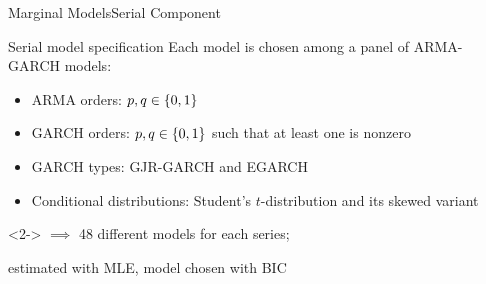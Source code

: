 \begin{frame}{Marginal Models}{Serial Component}
  \begin{block}{Serial model specification}
    Each model is chosen among a panel of ARMA-GARCH models:
    \begin{itemize}
    \item ARMA orders: \(p,q \in \cbr{0,1}\)
    \item GARCH orders: \(p,q \in \cbr{0,1}\) such that at least one is nonzero
    \item GARCH types: GJR-GARCH and EGARCH
    \item Conditional distributions: Student's \(t\)-distribution and its skewed variant
    \end{itemize}
  \end{block}
  \begin{block}{}<2->
    \(\implies\) 48 different models for each series;

    estimated with MLE, model chosen with BIC
  \end{block}
\end{frame}

